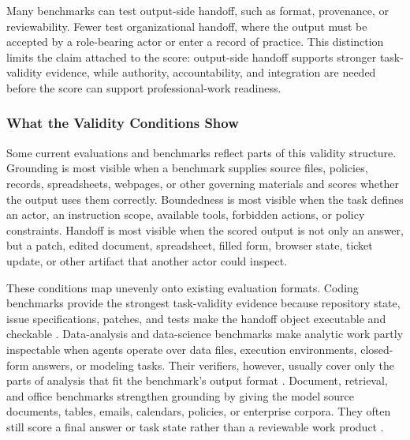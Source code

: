 \documentclass{article}
\begin{document}
Many benchmarks can test output-side handoff, such as format, provenance, or reviewability.
Fewer test organizational handoff, where the output must be accepted by a role-bearing actor or enter a record of practice.
This distinction limits the claim attached to the score: output-side handoff supports stronger task-validity evidence, while authority, accountability, and integration are needed before the score can support professional-work readiness.

\subsubsection{What the Validity Conditions Show}
\label{sec:validity-patterns}

Some current evaluations and benchmarks reflect parts of this validity structure.
Grounding is most visible when a benchmark supplies source files, policies, records, spreadsheets, webpages, or other governing materials and scores whether the output uses them correctly.
Boundedness is most visible when the task defines an actor, an instruction scope, available tools, forbidden actions, or policy constraints.
Handoff is most visible when the scored output is not only an answer, but a patch, edited document, spreadsheet, filled form, browser state, ticket update, or other artifact that another actor could inspect.

These conditions map unevenly onto existing evaluation formats.
Coding benchmarks provide the strongest task-validity evidence because repository state, issue specifications, patches, and tests make the handoff object executable and checkable \citep{jimenez2024swebench,deng2025swebenchpro}.
Data-analysis and data-science benchmarks make analytic work partly inspectable when agents operate over data files, execution environments, closed-form answers, or modeling tasks.
Their verifiers, however, usually cover only the parts of analysis that fit the benchmark's output format \citep{hu2024infiagent,jing2024dsbench}.
Document, retrieval, and office benchmarks strengthen grounding by giving the model source documents, tables, emails, calendars, policies, or enterprise corpora.
They often still score a final answer or task state rather than a reviewable work product \citep{opsahlong2026officeqapro,wang2024officebench}.
\end{document}
